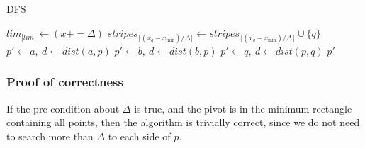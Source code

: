 \begin{algorithm}[h]
    \caption{\Acrlong*{DFS}}
    \label{alg-dfs}
    \begin{algorithmic}[1]
            \EndFor
             {$lim_{|lim|} \gets (x += \Delta)$}
            \EndWhile
             
             {$stripes_{\lfloor (x_q-x_{\min})/\Delta \rfloor} \gets stripes_{\lfloor (x_q-x_{\min})/\Delta \rfloor} \cup \{q\}$}
            \EndFor
        \EndFunction
             {$p' \gets a,~d \gets dist(a,p)$}
            \EndIf
             {$p' \gets b,~d \gets dist(b,p)$}
            \EndIf
                 {$p' \gets q,~d \gets dist(p,q)$}
                \EndIf
            \EndFor
            \State \Return $p'$
        \EndFunction
    \end{algorithmic}
\end{algorithm}
\subsubsection{Proof of correctness}
If the pre-condition about $\Delta$ is true, and the pivot is in the minimum rectangle containing all points, then the algorithm is trivially correct, since we do not need to search more than $\Delta$ to each side of $p$.

